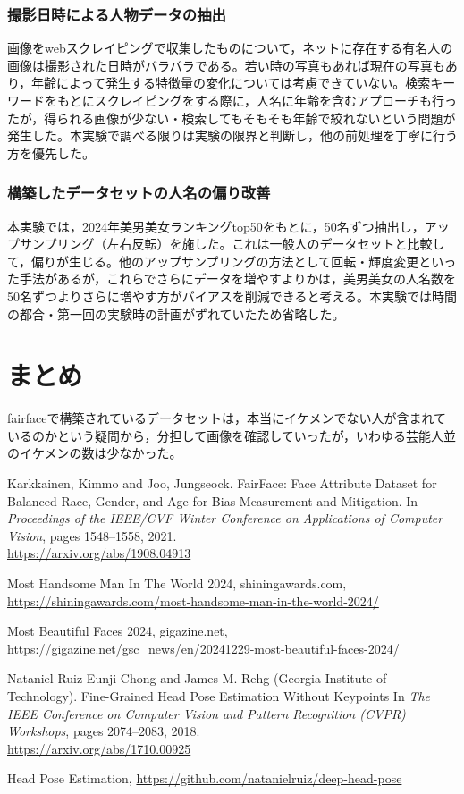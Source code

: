 \documentclass[a4paper,11pt,titlepage]{jsarticle}
\begin{document}
\subsubsection{撮影日時による人物データの抽出}
画像をwebスクレイピングで収集したものについて，ネットに存在する有名人の画像は撮影された日時がバラバラである。若い時の写真もあれば現在の写真もあり，年齢によって発生する特徴量の変化については考慮できていない。検索キーワードをもとにスクレイピングをする際に，人名に年齢を含むアプローチも行ったが，得られる画像が少ない・検索してもそもそも年齢で絞れないという問題が発生した。本実験で調べる限りは実験の限界と判断し，他の前処理を丁寧に行う方を優先した。

\subsubsection{構築したデータセットの人名の偏り改善}
本実験では，2024年美男美女ランキングtop50をもとに，50名ずつ抽出し，アップサンプリング（左右反転）を施した。これは一般人のデータセットと比較して，偏りが生じる。他のアップサンプリングの方法として回転・輝度変更といった手法があるが，これらでさらにデータを増やすよりかは，美男美女の人名数を50名ずつよりさらに増やす方がバイアスを削減できると考える。本実験では時間の都合・第一回の実験時の計画がずれていたため省略した。

\section{まとめ}
fairfaceで構築されているデータセットは，本当にイケメンでない人が含まれているのかという疑問から，分担して画像を確認していったが，いわゆる芸能人並のイケメンの数は少なかった。


\begin{thebibliography}{9}
    Karkkainen, Kimmo and Joo, Jungseock.
    FairFace: Face Attribute Dataset for Balanced Race, Gender, and Age for Bias Measurement and Mitigation.
    In \textit{Proceedings of the IEEE/CVF Winter Conference on Applications of Computer Vision}, pages 1548--1558, 2021.\\
        \url{https://arxiv.org/abs/1908.04913}
    
    Most Handsome Man In The World 2024, shiningawards.com, \\
    \url{https://shiningawards.com/most-handsome-man-in-the-world-2024/}
    
    Most Beautiful Faces 2024, gigazine.net, \\ \url{https://gigazine.net/gsc_news/en/20241229-most-beautiful-faces-2024/}
    
        Nataniel Ruiz Eunji Chong and James M. Rehg (Georgia Institute of Technology).
        Fine-Grained Head Pose Estimation Without Keypoints
         In \textit{The IEEE Conference on Computer Vision and Pattern Recognition (CVPR) Workshops}, pages 2074--2083, 2018. \\
          \url{https://arxiv.org/abs/1710.00925}

    Head Pose Estimation, \url{https://github.com/natanielruiz/deep-head-pose}
\end{thebibliography}
\end{document}
